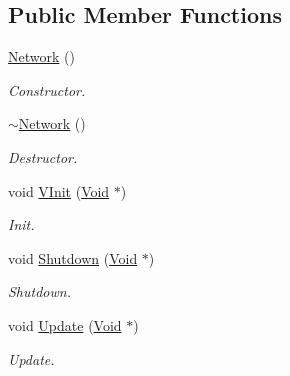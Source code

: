 \subsection*{Public Member Functions}
\begin{DoxyCompactItemize}
\item 
\hypertarget{classNetwork_a3cc2fb4f8fa4d507077e8da85ce5a1c8}{
\hyperlink{classNetwork_a3cc2fb4f8fa4d507077e8da85ce5a1c8}{Network} ()}
\label{classNetwork_a3cc2fb4f8fa4d507077e8da85ce5a1c8}

\begin{DoxyCompactList}\small\item\em Constructor. \item\end{DoxyCompactList}\item 
\hypertarget{classNetwork_a7a4e19cdb4bf0c7ecf82baa643831492}{
\hyperlink{classNetwork_a7a4e19cdb4bf0c7ecf82baa643831492}{$\sim$Network} ()}
\label{classNetwork_a7a4e19cdb4bf0c7ecf82baa643831492}

\begin{DoxyCompactList}\small\item\em Destructor. \item\end{DoxyCompactList}\item 
\hypertarget{classNetwork_a4909f2ccd5fd8d962ad584db30fd5758}{
void \hyperlink{classNetwork_a4909f2ccd5fd8d962ad584db30fd5758}{VInit} (\hyperlink{structVoid}{Void} $\ast$)}
\label{classNetwork_a4909f2ccd5fd8d962ad584db30fd5758}

\begin{DoxyCompactList}\small\item\em Init. \item\end{DoxyCompactList}\item 
\hypertarget{classNetwork_a11d3ce151fbc0c830591035470eed614}{
void \hyperlink{classNetwork_a11d3ce151fbc0c830591035470eed614}{Shutdown} (\hyperlink{structVoid}{Void} $\ast$)}
\label{classNetwork_a11d3ce151fbc0c830591035470eed614}

\begin{DoxyCompactList}\small\item\em Shutdown. \item\end{DoxyCompactList}\item 
\hypertarget{classNetwork_a6390ce3f13d4b49dbe954d50f80aa6fd}{
void \hyperlink{classNetwork_a6390ce3f13d4b49dbe954d50f80aa6fd}{Update} (\hyperlink{structVoid}{Void} $\ast$)}
\label{classNetwork_a6390ce3f13d4b49dbe954d50f80aa6fd}

\begin{DoxyCompactList}\small\item\em Update. \item\end{DoxyCompactList}\end{DoxyCompactItemize}


